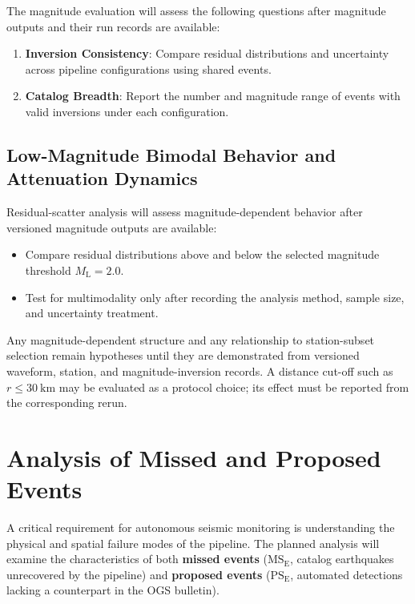 The magnitude evaluation will assess the following questions after magnitude
outputs and their run records are available:
\begin{enumerate}
  \item \textbf{Inversion Consistency}: Compare residual distributions and
    uncertainty across pipeline configurations using shared events.
  \item \textbf{Catalog Breadth}: Report the number and magnitude range of
    events with valid inversions under each configuration.
\end{enumerate}

\subsection{Low-Magnitude Bimodal Behavior and Attenuation Dynamics}
\label{subsec:bimodal_magnitude}

Residual-scatter analysis will assess magnitude-dependent behavior after
versioned magnitude outputs are available:
\begin{itemize}
  \item Compare residual distributions above and below the selected magnitude
    threshold $M_{\mathrm{L}} = 2.0$.
  \item Test for multimodality only after recording the analysis method,
    sample size, and uncertainty treatment.
\end{itemize}

Any magnitude-dependent structure and any relationship to station-subset
selection remain hypotheses until they are demonstrated from versioned
waveform, station, and magnitude-inversion records. A distance
cut-off such as
$r \le \qty{30}{\kilo\meter}$ may be evaluated as a protocol choice; its
effect must be reported from the corresponding rerun.

\section{Analysis of Missed and Proposed Events}
\label{sec:missed_proposed_analysis}

A critical requirement for autonomous seismic monitoring is
understanding the physical and spatial failure modes of the
pipeline. The planned analysis will examine the characteristics of
both \textbf{missed
events} ($\mathrm{MS}_{\mathrm{E}}$, catalog earthquakes unrecovered
by the pipeline) and \textbf{proposed events}
($\mathrm{PS}_{\mathrm{E}}$, automated detections lacking a
counterpart in the \ac{OGS} bulletin).

